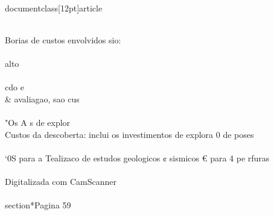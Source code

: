 \\documentclass[12pt]{article}
\begin{document}
\\
Borias de custos envolvidos sio:\\
\\
alto\\
\\
cdo e\\& avaliagao, sao cus\\
\\
"Os A s de explor\\
Custos da descoberta: inclui os investimentos de explora 0 de poses\\
\\
‘0S para a Tealizaco de estudos geologicos ¢ sismicos € para 4 pe rfuras\\
\\
Digitalizada com CamScanner\\

\\section*{Pagina 59}
\end{document}
